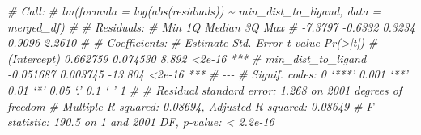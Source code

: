 \documentclass[
]{article}
\newenvironment{Shaded}{\begin{snugshade}}{\end{snugshade}}
\newcommand{\AttributeTok}[1]{\textcolor[rgb]{0.13,0.29,0.53}{#1}}
\newcommand{\CommentTok}[1]{\textcolor[rgb]{0.56,0.35,0.01}{\textit{#1}}}
\newcommand{\ConstantTok}[1]{\textcolor[rgb]{0.56,0.35,0.01}{#1}}
\newcommand{\FunctionTok}[1]{\textcolor[rgb]{0.13,0.29,0.53}{\textbf{#1}}}
\newcommand{\NormalTok}[1]{#1}
\newcommand{\OtherTok}[1]{\textcolor[rgb]{0.56,0.35,0.01}{#1}}
\newcommand{\SpecialCharTok}[1]{\textcolor[rgb]{0.81,0.36,0.00}{\textbf{#1}}}
\newcommand{\StringTok}[1]{\textcolor[rgb]{0.31,0.60,0.02}{#1}}
\begin{document}
\begin{Shaded}
\begin{Highlighting}[]
\CommentTok{\# Call:}
\CommentTok{\# lm(formula = log(abs(residuals)) \textasciitilde{} min\_dist\_to\_ligand, data = merged\_df)}
\CommentTok{\# }
\CommentTok{\# Residuals:}
\CommentTok{\#     Min      1Q  Median      3Q     Max }
\CommentTok{\# {-}7.3797 {-}0.6332  0.3234  0.9096  2.2610 }
\CommentTok{\# }
\CommentTok{\# Coefficients:}
\CommentTok{\#                     Estimate Std. Error t value Pr(\textgreater{}|t|)    }
\CommentTok{\# (Intercept)         0.662759   0.074530   8.892   \textless{}2e{-}16 ***}
\CommentTok{\# min\_dist\_to\_ligand {-}0.051687   0.003745 {-}13.804   \textless{}2e{-}16 ***}
\CommentTok{\# {-}{-}{-}}
\CommentTok{\# Signif. codes:  0 ‘***’ 0.001 ‘**’ 0.01 ‘*’ 0.05 ‘.’ 0.1 ‘ ’ 1}
\CommentTok{\# }
\CommentTok{\# Residual standard error: 1.268 on 2001 degrees of freedom}
\CommentTok{\# Multiple R{-}squared:  0.08694, Adjusted R{-}squared:  0.08649 }
\CommentTok{\# F{-}statistic: 190.5 on 1 and 2001 DF,  p{-}value: \textless{} 2.2e{-}16}
\end{Highlighting}
\end{Shaded}

\begin{Shaded}
\end{Shaded}
\end{document}
